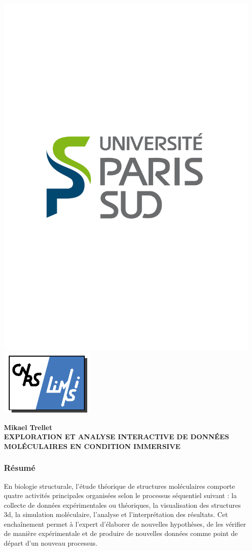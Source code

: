 \backmatter 
\chapter*{}%
\pagestyle{empty}

\setlength{\headheight}{0.pt}
        
\includegraphics[height=1.cm]{./figures/LogoUPSUD.pdf}\hfill
\includegraphics[height=1.cm]{./figures/limsilogo_vectoriel.pdf}\hfill


\begin{center}
 \textbf{Mikael Trellet} \\
 \textbf{EXPLORATION ET ANALYSE INTERACTIVE DE DONNÉES MOLÉCULAIRES EN CONDITION IMMERSIVE}
\end{center}
    

\footnotesize
\subsection*{Résumé}












\footnotesize
En biologie structurale, l'étude théorique de structures moléculaires comporte quatre activités principales organisées selon le processus séquentiel suivant : la collecte de données expérimentales ou théoriques, la visualisation des structures 3d, la simulation moléculaire, l'analyse et l'interprétation des résultats. Cet enchaînement permet à l'expert d'élaborer de nouvelles hypothèses, de les vérifier de manière expérimentale et de produire de nouvelles données comme point de départ d'un nouveau processus.

